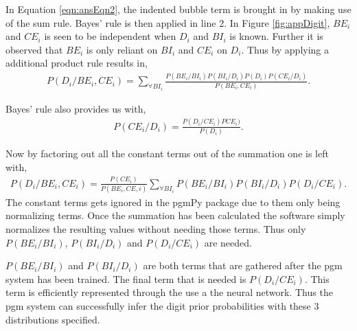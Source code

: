 In Equation \ref{eqn:ansEqn2}, the indented bubble term is brought in by making use of the sum rule. Bayes' rule is then applied in line 2. In Figure \ref{fig:appDigit}, $BE_i$ and $CE_i$ is seen to be independent when $D_i$ and $BI_i$ is known. Further it is observed that $BE_i$ is only reliant on $BI_i$ and $CE_i$ on $D_i$. Thus by applying a additional product rule results in,
\begin{align}
  P(D_i/BE_i,CE_i) =  \sum_{\forall BI_i}^{}\frac{P(BE_i/BI_i)P(BI_i/D_i)P(D_i)P(CE_i/D_i)}{P(BE_i,CE_i)}.
\label{eqn:ansEqn2}
\end{align}

Bayes' rule also provides us with,
\begin{align}
  P(CE_i/D_i)	=  \frac{P(D_i/CE_i)PCE_i)}{P(D_i)}.
\label{eqn:ansEqn2}
\end{align}

Now by factoring out all the constant terms out of the summation one is left with,
\begin{align}
  P(D_i/BE_i,CE_i) =  \frac{P(CE_i)}{P(BE_i,CE,i)}\sum_{\forall BI_i}^{}P(BE_i/BI_i)P(BI_i/D_i)P(D_i/CE_i).
\label{eqn:ansEqn2}
\end{align}
The constant terms gets ignored in the pgmPy package due to them only being normalizing terms. Once the summation has been calculated the software simply normalizes the resulting values without needing those terms. Thus only $P(BE_i/BI_i)$, $P(BI_i/D_i)$ and $P(D_i/CE_i)$ are needed.

$P(BE_i/BI_i)$ and  $P(BI_i/D_i)$ are both terms that are gathered after the pgm system has been trained. The final term that is needed is $P(D_i/CE_i)$. This term is efficiently represented through the use a the neural network. Thus the pgm system can successfully infer the digit prior probabilities with these 3 distributions specified.

